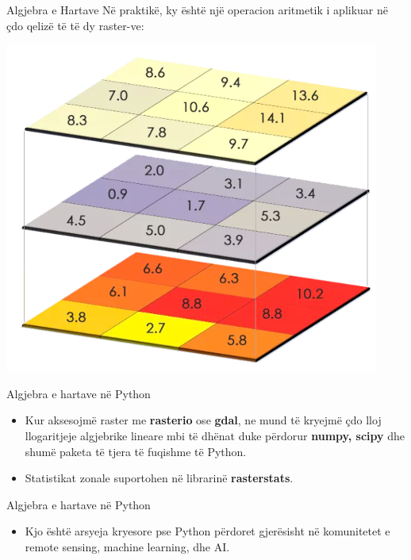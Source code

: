 \documentclass[
  ignorenonframetext,
]{beamer}
\providecommand{\tightlist}{%
  \setlength{\itemsep}{0pt}\setlength{\parskip}{0pt}}
\begin{document}
\begin{frame}{Algjebra e Hartave}
\protect\hypertarget{algjebra-e-hartave-3}{}
Në praktikë, ky është një operacion aritmetik i aplikuar në çdo qelizë
të të dy raster-ve:

\includegraphics{./Figs/map_algebra2.png}
\end{frame}

\begin{frame}{Algjebra e hartave në Python}
\protect\hypertarget{algjebra-e-hartave-nuxeb-python}{}
\begin{itemize}
\item
  Kur aksesojmë raster me \textbf{rasterio} ose \textbf{gdal}, ne mund
  të kryejmë çdo lloj llogaritjeje algjebrike lineare mbi të dhënat duke
  përdorur \textbf{numpy, scipy} dhe shumë paketa të tjera të fuqishme
  të Python.
\item
  Statistikat zonale suportohen në librarinë \textbf{rasterstats}.
\end{itemize}
\end{frame}

\begin{frame}{Algjebra e hartave në Python}
\protect\hypertarget{algjebra-e-hartave-nuxeb-python-1}{}
\begin{itemize}
\tightlist
\item
  Kjo është arsyeja kryesore pse Python përdoret gjerësisht në
  komunitetet e remote sensing, machine learning, dhe AI.
\end{itemize}
\end{frame}
\end{document}
